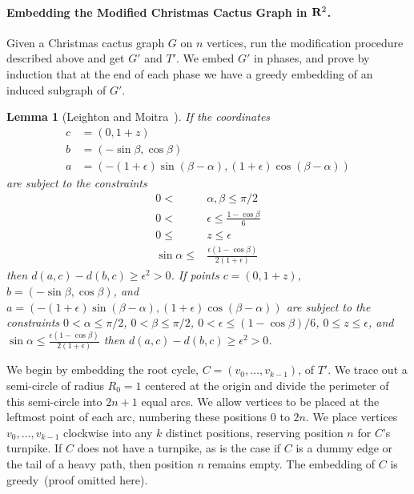 \documentclass[11pt]{article}
\newtheorem{lemma}[theorem]{Lemma}
\newcommand{\R}{{\bf R}}
\newcommand{\Leaveout}[2]{#2}
\renewcommand{\subsection}[1]{\paragraph{#1.}}
\begin{document}
\subsection{Embedding the Modified Christmas Cactus Graph in $\R^2$}
Given a Christmas cactus graph $G$ on $n$ vertices, run the modification 
procedure described above and get $G'$ and $T'$. We embed $G'$ in 
phases, and prove by induction that at the end of each phase
we have a greedy embedding of an induced subgraph of $G'$.

\begin{lemma}[Leighton and Moitra~\cite{lm-srgem-08}]
\label{lemma-geom}
\ifFull
If the coordinates 
\begin{align*}
c &= (0,1 + z) \\
b &= (-\sin \beta, \cos \beta) \\
a &= (-(1 + \epsilon)\sin(\beta - \alpha),(1+\epsilon)\cos(\beta - \alpha))
\end{align*}
are subject to the constraints
\begin{align*}
0 < &\alpha,\beta \leq \pi/2 \\
0 < &\epsilon \leq \frac{1 - \cos \beta}{6} \\
0 \leq &z \leq \epsilon \\
\sin \alpha \leq &\frac{\epsilon(1 - \cos \beta)}{2(1+\epsilon)}
\end{align*}
then $d(a,c) - d(b,c) \geq \epsilon^2 > 0$.
\else If points
$c = (0,1 + z)$, $b = (-\sin \beta, \cos \beta)$, and 
$a = (-(1 + \epsilon)\sin(\beta - \alpha),(1+\epsilon)\cos(\beta - \alpha))$
are subject to the constraints
$0 < \alpha \leq \pi/2$, $0 < \beta \leq \pi/2$, 
$0 < \epsilon \leq (1 - \cos \beta)/6$,
$0 \leq z \leq \epsilon$, and
$\sin \alpha \leq \frac{\epsilon(1 - \cos \beta)}{2(1+\epsilon)}$ then $d(a,c) - d(b,c) \geq \epsilon^2 > 0$.
\fi
\end{lemma}

We begin by embedding the root cycle, $C = (v_0,\ldots,v_{k-1})$, of $T'$. 
We trace out a semi-circle of radius $R_0=1$ centered at the origin and 
divide the perimeter of this semi-circle into $2n+1$ equal arcs. We allow
vertices to be placed at the leftmost point of each arc, numbering these 
positions $0$ to $2n$. We place vertices $v_0,\ldots,v_{k-1}$ clockwise into 
any $k$ distinct positions, reserving position $n$ for $C$'s turnpike. If $C$ 
does not have a turnpike, as is the case if $C$ is a dummy edge or the tail 
of a heavy path, then position $n$ remains empty. The embedding of $C$ is 
greedy\Leaveout{}{\ (proof omitted here)}.
\end{document}
